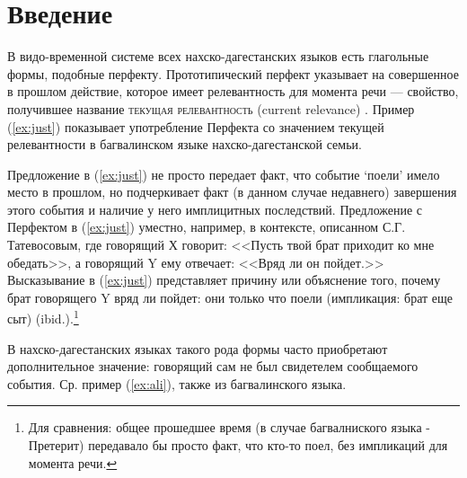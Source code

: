 
\chapter*{Введение} \label{sec:intro}
\pagestyle{plain}

В видо-временной системе всех нахско-дагестанских языков есть глагольные формы, подобные перфекту. Прототипический перфект указывает на совершенное в прошлом действие, которое имеет релевантность для момента речи --- свойство, получившее название \textsc{текущая релевантность} (current relevance) \citep[24--25]{comrie1985}. Пример (\ref{ex:just}) показывает употребление Перфекта со значением текущей релевантности в багвалинском языке нахско-дагестанской семьи.


Предложение в (\ref{ex:just}) не просто передает факт, что событие `поели' имело место в прошлом, но подчеркивает факт (в данном случае недавнего) завершения этого события и наличие у него имплицитных последствий. Предложение с Перфектом в (\ref{ex:just}) уместно, например, в контексте, описанном С.Г. Татевосовым, где говорящий Х говорит: <<Пусть твой брат приходит ко мне обедать>>, а говорящий Y ему отвечает: <<Вряд ли он пойдет.>> Высказывание в (\ref{ex:just}) представляет причину или объяснение того, почему брат говорящего Y вряд ли пойдет: они только что поели (импликация: брат еще сыт) (ibid.).\footnote{Для сравнения: общее прошедшее время (в случае багвалниского языка - Претерит) передавало бы просто факт, что кто-то поел, без импликаций для момента речи.}
\par В нахско-дагестанских языках такого рода формы часто приобретают дополнительное значение: говорящий сам не был свидетелем сообщаемого события. Ср. пример (\ref{ex:ali}), также из багвалинского языка.\label{p:context}


